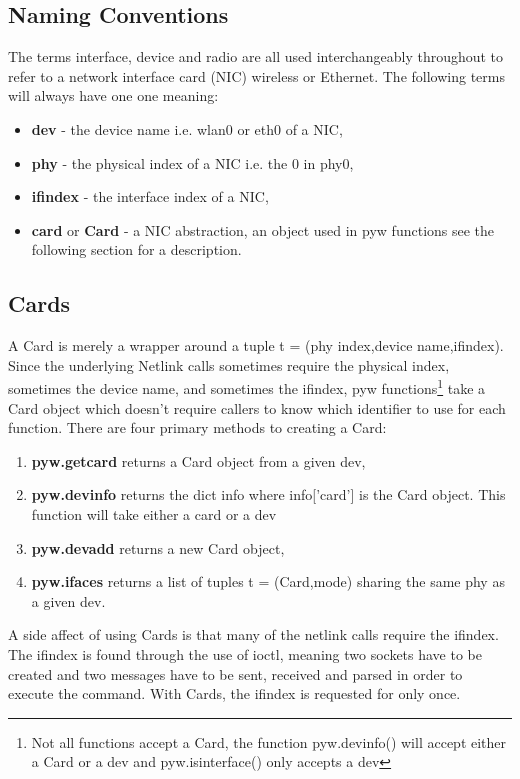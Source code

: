 \documentclass[11pt]{article}
\begin{document}
\subsection{Naming Conventions}
The terms interface, device and radio are all used interchangeably throughout to 
refer to a network interface card (NIC) wireless or Ethernet. The following terms 
will always have one one meaning:
\begin{itemize}
\item \textbf{dev} - the device name i.e. wlan0 or eth0 of a NIC, 
\item \textbf{phy} - the physical index of a NIC i.e. the 0 in phy0,
\item \textbf{ifindex} - the interface index of a NIC,
\item \textbf{card} or \textbf{Card} - a NIC abstraction, an object used in pyw 
functions see the following section for a description. 
\end{itemize}

\subsection{Cards}
A Card is merely a wrapper around a tuple t = (phy index,device name,ifindex). 
Since the underlying Netlink calls sometimes require the physical index, sometimes 
the device name, and sometimes the ifindex, pyw functions\footnote{Not all functions 
accept a Card, the function pyw.devinfo() will accept either a Card or a dev and 
pyw.isinterface() only accepts a dev} take a Card object which doesn't require
callers to know which identifier to use for each function. There are four primary methods to creating a Card: 
\begin{enumerate}
\item \textbf{pyw.getcard} returns a Card object from a given dev,
\item \textbf{pyw.devinfo} returns the dict info where info['card'] is the Card 
object. This function will take either a card or a dev
\item \textbf{pyw.devadd} returns a new Card object, 
\item \textbf{pyw.ifaces} returns a list of tuples t = (Card,mode) sharing the 
same phy as a given dev.
\end{enumerate}

A side affect of using Cards is that many of the netlink calls require the ifindex.
The ifindex is found through the use of ioctl, meaning two sockets have to be 
created and two messages have to be sent, received and parsed in order to execute
the command. With Cards, the ifindex is requested for only once. \\
\end{document}
